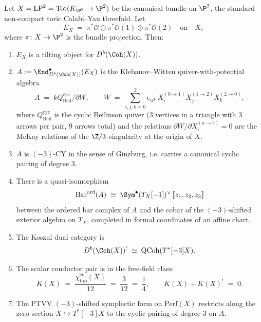 \begin{theorem}[Geometric CY-B at \texorpdfstring{$d=3$}{d=3} for local \texorpdfstring{$\P^2$}{P-2}]
\label{thm:cy-b-d3-lp2-koszul}
Let $X = \mathrm{LP}^2 = \mathrm{Tot}(K_{\P^2}\to \P^2)$ be the canonical bundle on $\P^2$, the standard non-compact toric Calabi--Yau threefold. Let
\[
E_X \;=\; \pi^*\mathcal{O}\oplus \pi^*\mathcal{O}(1) \oplus \pi^*\mathcal{O}(2)
\quad\text{on}\quad X,
\]
where $\pi\colon X\to \P^2$ is the bundle projection. Then:
\begin{enumerate}[label=\textup{(\roman*)}]
 \item $E_X$ is a tilting object for $D^b(\Coh(X))$.
 \item $A := \End^\bullet_{D^b(\Coh(X))}(E_X)$ is the Klebanov--Witten quiver-with-potential algebra
 \[
 A \;=\; kQ_{\mathrm{Beil}}^{\mathrm{cyc}} \big/ \partial W,
 \qquad
 W \;=\; \sum_{i,j,k=0}^{2} \epsilon_{ijk}\, X_i^{(0\to 1)} X_j^{(1\to 2)} X_k^{(2\to 0)},
 \]
 where $Q_{\mathrm{Beil}}^{\mathrm{cyc}}$ is the cyclic Beilinson quiver ($3$ vertices in a triangle with $3$ arrows per pair, $9$ arrows total) and the relations $\partial W/\partial X_i^{(a\to b)} = 0$ are the McKay relations of the $\Z/3$-singularity at the origin of $X$.
 \item $A$ is $(-3)$-CY in the sense of Ginzburg, i.e. carries a canonical cyclic pairing of degree $3$.
 \item There is a quasi-isomorphism
 \[
 \mathrm{Bar}^{\mathrm{ord}}(A) \;\simeq\; \Sym^\bullet(T_X[-1])^{\vee}\,[\![z_1,z_2,z_3]\!]
 \]
 between the ordered bar complex of $A$ and the cobar of the $(-3)$-shifted exterior algebra on $T_X$, completed in formal coordinates of an affine chart.
 \item The Koszul dual category is
 \[
 D^b(\Coh(X))^! \;\simeq\; \mathrm{QCoh}(T^*[-3]X).
 \]
 \item The scalar conductor pair is in the free-field class:
 \[
 K(X) \;=\; \frac{\chi^{\mathrm{eq}}_{\mathrm{top}}(X)}{12} \;=\; \frac{3}{12} \;=\; \frac{1}{4},
 \qquad
 K(X) + K(X)^! \;=\; 0.
 \]
 \item The PTVV $(-3)$-shifted symplectic form on $\mathrm{Perf}(X)$ restricts along the zero section $X\hookrightarrow T^*[-3]X$ to the cyclic pairing of degree $3$ on $A$.
\end{enumerate}
\end{theorem}

